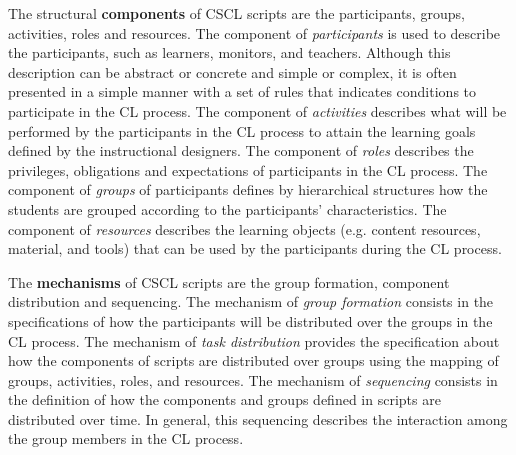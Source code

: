 The structural \textbf{components} of CSCL scripts are the participants, groups, activities, roles and resources.
The component of \emph{participants} is used to describe the participants, such as learners, monitors, and teachers. 
Although this description can be abstract or concrete and simple or complex, it is often presented in a simple manner with a set of rules that indicates conditions to participate in the CL process.
The component of \emph{activities} describes what will be performed by the participants in the CL process to attain the learning goals defined by the instructional designers.
The component of \emph{roles} describes the privileges, obligations and expectations of participants in the CL process.
The component of \emph{groups} of participants defines by hierarchical structures how the students are grouped according to the participants' characteristics.
The component of \emph{resources} describes the learning objects (e.g. content resources, material, and tools) that can be used by the participants during the CL process.

The \textbf{mechanisms} of CSCL scripts are the group formation, component distribution and sequencing.
The mechanism of \emph{group formation} consists in the specifications of how the participants will be distributed over the groups in the CL process.
The mechanism of \emph{task distribution} provides the specification about how the components of scripts are distributed over groups using the mapping of groups, activities, roles, and resources.
The mechanism of \emph{sequencing} consists in the definition of how the components and groups defined in scripts are distributed over time.
In general, this sequencing describes the interaction among the group members in the CL process.

